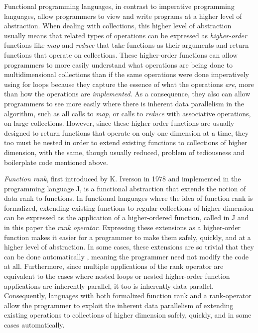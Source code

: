 Functional programming languages, in contrast to imperative programming languages, 
allow programmers to view and write programs at a higher level of abstraction.
When dealing with collections, 
this higher level of abstraction usually means that related types of operations can be expressed as \textit{higher-order} functions 
like \textit{map} and \textit{reduce} that take functions as their arguments and return functions that operate on collections.
These higher-order functions can allow programmers to more easily understand what operations are being done to multidimensional collections 
than if the same operations were done imperatively using for loops 
because they capture the essence of what the operations \textit{are}, more than how the operations are \textit{implemented}.
As a consequence, they also can allow programmers 
to see more easily where there is inherent data parallelism in the algorithm, 
such as all calls to \textit{map}, or calls to \textit{reduce} with associative operations, on large collections.
However, since these higher-order functions are usually designed to return functions that operate on only one dimension at a time, 
they too must be nested in order to extend existing functions to collections of higher dimension, 
with the same, though usually reduced, problem of tediousness and boilerplate code mentioned above.

\textit{Function rank}, first introduced by K. Iverson in 1978\cite{opandfunc} 
and implemented in the programming language J, 
is a functional abstraction that extends the notion of data rank to functions. 
In functional languages where the idea of function rank is formalized, 
extending existing functions to regular collections of higher dimension 
can be expressed as the application of a higher-ordered function, 
called in J and in this paper the \textit{rank operator}\cite{jvocab}. 
Expressing these extensions as a higher-order function 
makes it easier for a programmer to make them safely, quickly, and at a higher level of abstraction.
In some cases, these extensions are so trivial that they can be done automatically\cite{jvocab} \cite{rankanduni}, 
meaning the programmer need not modify the code at all. 
Furthermore, since multiple applications of the rank operator 
are equivalent to the cases where nested loops or nested higher-order function applications are inherently parallel, 
it too is inherently data parallel.
Consequently, languages with both formalized function rank and a rank-operator allow the programmer to 
exploit the inherent data parallelism of extending existing operations to collections of higher dimension 
safely, quickly, and in some cases automatically.

